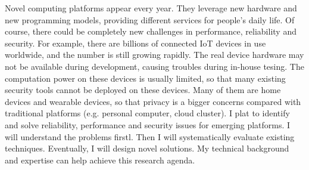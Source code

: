 \documentclass[10pt]{article}
\begin{document}
Novel computing platforms appear every year. 
They leverage new hardware and new programming models,
providing different services for people's daily life. 
Of course, there could be completely new challenges 
in performance, reliability and security.
For example, there are billions of connected IoT devices in use worldwide, 
and the number is still growing rapidly. 
The real device hardware may not be available during development, 
causing troubles during in-house tesing. 
The computation power on these devices is usually limited, 
so that many existing security tools cannot be deployed on these devices. 
Many of them are home devices and wearable devices,  
so that privacy is a bigger concerns compared with traditional platforms (e.g. personal computer, 
cloud cluster).
I plat to identify and solve reliability, performance and security issues 
for emerging platforms. 
I will understand the problems firstl. Then I will systematically evaluate existing techniques.
Eventually, I will design novel solutions. 
My technical background and expertise can help achieve this research agenda. 



\newpage


\end{document}
